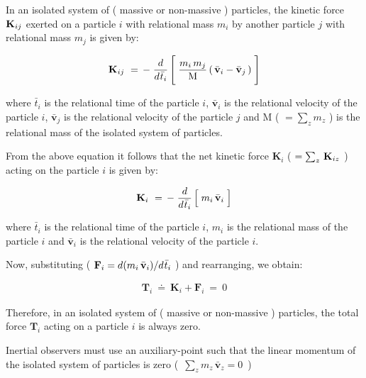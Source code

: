 \documentclass[10pt,fleqn]{article}
\begin{document}
\noindent In an isolated system of ( massive or non-massive ) particles, the kinetic force $\mathbf{K}_{\hspace{+0.012em}ij}$ exerted on a particle $i$ with relational mass $m_i$ by another particle $j$ with relational mass $m_j$ is given by:
\par \vspace{-0.45em}
\begin{eqnarray*}
\mathbf{K}_{\hspace{+0.012em}ij} ~=\, - \; \dfrac{d}{d\hspace{+0.06em}\bar{t}_i} \, \Bigg [ \; \dfrac{m_i \, m_j}{\mathrm{M}} \, ( \, \bar{\mathbf{v}}_i - \bar{\mathbf{v}}_j \, ) \; \Bigg ]
\end{eqnarray*}
\par \vspace{+0.60em}
\noindent where $\bar{t}_i$ is the relational time of the particle $i$, $\bar{\mathbf{v}}_i$ is the relational velocity of the particle $i$, $\bar{\mathbf{v}}_j$ is the relational velocity of the particle $j$ and $\mathrm{M}$ {\small ( $ = \sum_z m_z$ )} is the relational mass of the isolated system of particles.
\par \vspace{+0.60em}
\noindent From the above equation it follows that the net kinetic force $\mathbf{K}_i$ {\small ( $ = \sum_z \, \mathbf{K}_{\hspace{+0.012em}iz}$ )} acting on the particle $i$ is given by:
\par \vspace{-0.60em}
\begin{eqnarray*}
\mathbf{K}_i ~=\, - \; \dfrac{d}{d\hspace{+0.06em}\bar{t}_i} \, \Big [ \; m_i \, \bar{\mathbf{v}}_i \; \Big ]
\end{eqnarray*}
\par \vspace{+0.60em}
\noindent where $\bar{t}_i$ is the relational time of the particle $i$, $m_i$ is the relational mass of the particle $i$ and $\bar{\mathbf{v}}_i$ is the relational velocity of the particle $i$.
\par \vspace{+0.60em}
\noindent Now, substituting ( $\mathbf{F}_i = d\hspace{+0.012em}( m_i \, \bar{\mathbf{v}}_i ) / d\hspace{+0.06em}\bar{t}_i$ ) and rearranging, we obtain:
\par \vspace{-0.81em}
\begin{eqnarray*}
\mathbf{T}_i ~\doteq~ \mathbf{K}_i + \mathbf{F}_i ~=~ 0
\end{eqnarray*}
\par \vspace{+0.60em}
\noindent Therefore, in an isolated system of ( massive or non-massive ) particles, the total force $\mathbf{T}_i$ acting on a particle $i$ is always zero.
\par \vspace{+0.60em}
\noindent Inertial observers must use an auxiliary-point such that the linear momentum of the isolated system of particles is zero \hbox {{\small ( $\sum_z m_z \, \bar{\mathbf{v}}_z = 0$ )}}
\end{document}

